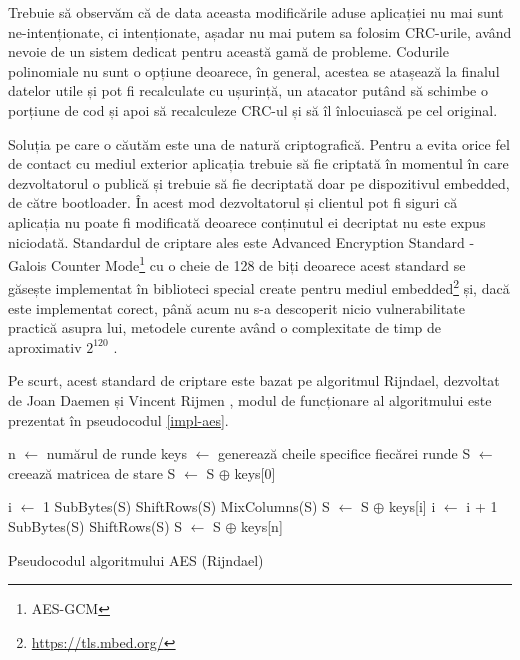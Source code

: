 \documentclass[12pt,a4paper,titlepage]{report}
\begin{document}
Trebuie să observăm că de data aceasta modificările aduse aplicației nu mai sunt ne-intenționate, ci intenționate, așadar nu mai putem sa folosim CRC-urile, având nevoie de un sistem dedicat pentru această gamă de probleme. Codurile polinomiale nu sunt o opțiune deoarece, în general, acestea se atașează la finalul datelor utile și pot fi recalculate cu ușurință, un atacator putând să schimbe o porțiune de cod și apoi să recalculeze CRC-ul și să îl înlocuiască pe cel original.

Soluția pe care o căutăm este una de natură criptografică. Pentru a evita orice fel de contact cu mediul exterior aplicația trebuie să fie criptată în momentul în care dezvoltatorul o publică și trebuie să fie decriptată doar pe dispozitivul embedded, de către bootloader. În acest mod dezvoltatorul și clientul pot fi siguri că aplicația nu poate fi modificată deoarece conținutul ei decriptat nu este expus niciodată. Standardul de criptare ales este Advanced Encryption Standard - Galois Counter Mode\footnote{AES-GCM} \cite{wikiAes} cu o cheie de 128 de biți deoarece acest standard se găsește implementat în biblioteci special create pentru mediul embedded\footnote{\url{https://tls.mbed.org/}} și, dacă este implementat corect, până acum nu s-a descoperit nicio vulnerabilitate practică asupra lui, metodele curente având o complexitate de timp de aproximativ $2^{120}$ \cite{bogdanov}.

Pe scurt, acest standard de criptare este bazat pe algoritmul Rijndael, dezvoltat de Joan Daemen și Vincent Rijmen \cite{rijndael}, modul de funcționare al algoritmului este prezentat în pseudocodul \ref{impl-aes}.

\begin{algorithm}
\begin{algorithmic}
\State n $\gets$ numărul de runde
\State keys $\gets$ generează cheile specifice fiecărei runde
\State S $\gets$ creează matricea de stare
\State {}
\State S $\gets$ S $\oplus$ keys[0]

\State {}
\State i $\gets$ 1
\State SubBytes(S)
\State ShiftRows(S)
\State MixColumns(S)
\State S $\gets$ S $\oplus$ keys[i]
\State i $\gets$ i + 1
\EndWhile
\State {}
\State SubBytes(S)
\State ShiftRows(S)
\State S $\gets$ S $\oplus$ keys[n]

\end{algorithmic}

\caption{Pseudocodul algoritmului AES (Rijndael)}
\label{impl-aes}
\end{algorithm}
\end{document}
